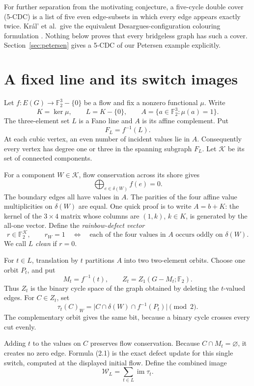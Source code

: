 \documentclass[11pt]{article}
\theoremstyle{definition}
\theoremstyle{remark}
\newcommand{\F}{\mathbb F}
\newcommand{\Kcal}{\mathcal K}
\newcommand{\Wcal}{\mathcal W}
\newcommand{\im}{\operatorname{im}}
\begin{document}
For further separation from the motivating conjecture, a five-cycle
double cover (5-CDC) is a list of five even edge-subsets in which every
edge appears exactly twice.  Kr\'al' et al.\ give the equivalent
Desargues-configuration colouring formulation
\cite[Theorem~7.1]{kral2009}.  Nothing below proves that every bridgeless
graph has such a cover.  Section~\ref{sec:petersen} gives a 5-CDC of our
Petersen example explicitly.

\section{A fixed line and its switch images}
\label{sec:setup}

Let \(f:E(G)\to\F_2^3-\{0\}\) be a flow and fix a nonzero functional
\(\mu\).  Write
\[
 K=\ker\mu,\qquad L=K-\{0\},\qquad
 A=\{a\in\F_2^3:\mu(a)=1\}.
\]
The three-element set \(L\) is a Fano line and \(A\) is its affine
complement.  Put
\[
                    F_L=f^{-1}(L).
\]
At each cubic vertex, an even number of incident values lie in \(A\).
Consequently every vertex has degree one or three in the spanning
subgraph \(F_L\).  Let \(\Kcal\) be its set of connected components.

For a component \(W\in\Kcal\), flow conservation across its shore gives
\[
                     \bigoplus_{e\in\delta(W)} f(e)=0.
\]
The boundary edges all have values in \(A\).  The parities of the four
affine value multiplicities on \(\delta(W)\) are equal.  One quick proof
is to write \(A=b+K\): the kernel of the \(3\times4\) matrix whose
columns are \((1,k)\), \(k\in K\), is generated by the all-one vector.
Define the \emph{rainbow-defect vector}
\[
 r\in\F_2^{\Kcal},\qquad
 r_W=1
\quad\Longleftrightarrow\quad
\text{each of the four values in \(A\) occurs oddly on \(\delta(W)\)}.
\]
We call \(L\) \emph{clean} if \(r=0\).

For \(t\in L\), translation by \(t\) partitions \(A\) into two
two-element orbits.  Choose one orbit \(P_t\), and put
\[
 M_t=f^{-1}(t),\qquad
 Z_t=Z_1(G-M_t;\F_2).
\]
Thus \(Z_t\) is the binary cycle space of the graph obtained by deleting
the \(t\)-valued edges.  For \(C\in Z_t\), set
\[
 \tau_t(C)_W
   =\bigl|C\cap\delta(W)\cap f^{-1}(P_t)\bigr|\pmod2.
                                                        \tag{2.1}
\]
The complementary orbit gives the same bit, because a binary cycle
crosses every cut evenly.

Adding \(t\) to the values on \(C\) preserves flow conservation.
Because \(C\cap M_t=\varnothing\), it creates no zero edge.  Formula
(2.1) is the exact defect update for this single switch, computed at the
displayed initial flow.  Define the combined image
\[
                  \Wcal_L=\sum_{t\in L}\im\tau_t.
                                                        \tag{2.2}
\]
\end{document}
